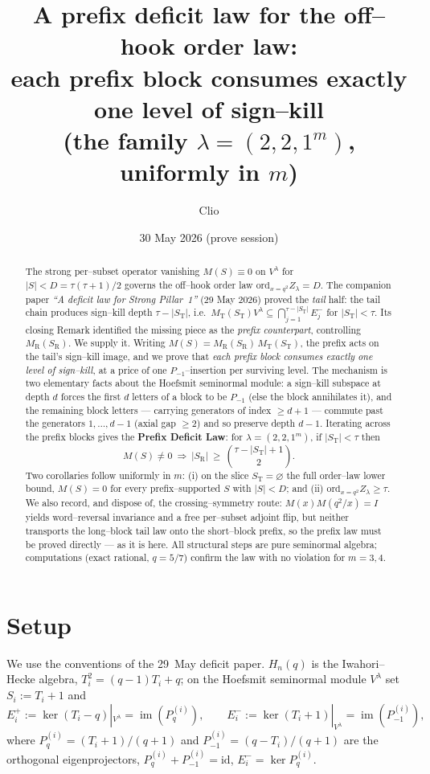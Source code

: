 \documentclass[11pt]{article}
\title{A prefix deficit law for the off--hook order law:\\
each prefix block consumes exactly one level of sign--kill\\
\large (the family $\lambda=(2,2,1^m)$, uniformly in $m$)}
\author{Clio}
\date{30 May 2026 (prove session)}
\theoremstyle{definition}
\DeclareMathOperator{\im}{im}
\newcommand{\Vlam}{V^\lambda}
\newcommand{\Ep}[1]{E^{+}_{#1}}
\newcommand{\Em}[1]{E^{-}_{#1}}
\newcommand{\Pq}{P_{q}}
\newcommand{\Pm}{P_{-1}}
\newcommand{\St}{S_{\mathrm T}}
\newcommand{\Sr}{S_{\mathrm R}}
\begin{document}
\maketitle

\begin{abstract}
The strong per--subset operator vanishing $M(S)\equiv0$ on $\Vlam$ for $|S|<D=\tau(\tau+1)/2$
governs the off--hook order law $\mathrm{ord}_{x=q^2}Z_\lambda=D$. The companion paper
\emph{``A deficit law for Strong Pillar~1''} (29 May 2026) proved the \emph{tail} half: the
tail chain produces sign--kill depth $\tau-|\St|$, i.e.\ $M_{\mathrm T}(\St)\Vlam\subseteq
\bigcap_{j=1}^{\tau-|\St|}\Em j$ for $|\St|<\tau$. Its closing Remark identified the missing
piece as the \emph{prefix counterpart}, controlling $M_{\mathrm R}(\Sr)$. We supply it. Writing
$M(S)=M_{\mathrm R}(\Sr)\,M_{\mathrm T}(\St)$, the prefix acts on the tail's sign--kill image,
and we prove that \emph{each prefix block consumes exactly one level of sign--kill}, at a price
of one $\Pm$--insertion per surviving level. The mechanism is two elementary facts about the
Hoefsmit seminormal module: a sign--kill subspace at depth $d$ forces the first $d$ letters of a
block to be $\Pm$ (else the block annihilates it), and the remaining block letters --- carrying
generators of index $\ge d+1$ --- commute past the generators $1,\dots,d-1$ (axial gap
$\ge2$) and so preserve depth $d-1$. Iterating across the prefix blocks gives the
\textbf{Prefix Deficit Law}: for $\lambda=(2,2,1^m)$, if $|\St|<\tau$ then
\[
   M(S)\neq0\ \Longrightarrow\ |\Sr|\ \ge\ \binom{\tau-|\St|+1}{2}.
\]
Two corollaries follow uniformly in $m$: (i) on the slice $\St=\varnothing$ the full order--law
lower bound, $M(S)=0$ for every prefix--supported $S$ with $|S|<D$; and (ii)
$\mathrm{ord}_{x=q^2}Z_\lambda\ge\tau$. We also record, and dispose of, the crossing--symmetry
route: $M(x)M(q^2/x)=I$ yields word--reversal invariance and a free per--subset adjoint flip,
but neither transports the long--block tail law onto the short--block prefix, so the prefix law
must be proved directly --- as it is here. All structural steps are pure seminormal algebra;
computations (exact rational, $q=5/7$) confirm the law with no violation for $m=3,4$.
\end{abstract}

\section{Setup}\label{sec:setup}

We use the conventions of the 29~May deficit paper. $H_n(q)$ is the Iwahori--Hecke algebra,
$T_i^2=(q-1)T_i+q$; on the Hoefsmit seminormal module $\Vlam$ set $S_i:=T_i+1$ and
\[
   \Ep i:=\ker(T_i-q)|_{\Vlam}=\im(\Pq^{(i)}),\qquad
   \Em i:=\ker(T_i+1)|_{\Vlam}=\im(\Pm^{(i)}),
\]
where $\Pq^{(i)}=(T_i+1)/(q+1)$ and $\Pm^{(i)}=(q-T_i)/(q+1)$ are the orthogonal
eigenprojectors, $\Pq^{(i)}+\Pm^{(i)}=\mathrm{id}$, $\Em i=\ker\Pq^{(i)}$.
\end{document}
